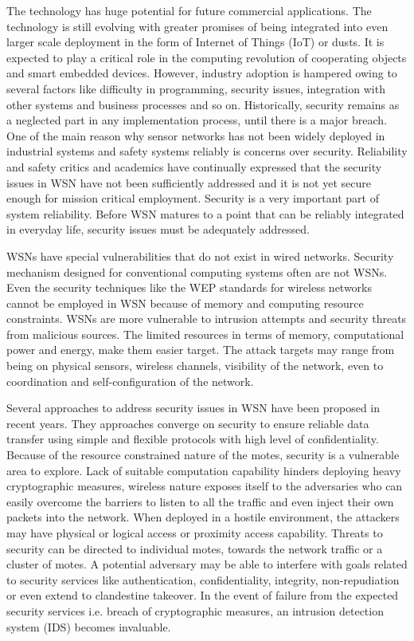\documentclass[conference,final]{IEEEtran}
\newcommand{\dme}[2]{\pdfmarkupcomment[markup=Highlight,color=yellow]{#1}{#2}}
\begin{document}
The technology has huge potential for future commercial applications. 
The technology is still evolving with greater promises of being integrated into even larger scale deployment in the form of Internet of Things (IoT) or dusts.
It is expected to play a critical role in the  computing revolution of cooperating objects and smart embedded devices. 
However, industry adoption is hampered owing to several factors like difficulty in programming, security issues, integration with other systems and business processes and so on. 
Historically, security remains as a neglected part in any implementation process, until there is a major breach. 
One of the main reason why sensor networks has not been widely deployed in industrial systems and safety systems reliably is concerns over security.
Reliability and safety critics and academics have continually expressed that  the security issues in WSN have not been sufficiently addressed and it is not yet secure enough for mission critical employment.
Security is a very important part of system reliability.
Before WSN matures to a point that can be reliably integrated in everyday life, security issues must be adequately addressed. 



WSNs have special vulnerabilities that do not exist in wired networks.
Security mechanism designed for conventional computing systems often are not \dme{appropriate for}{or ``applicable to''} WSNs.
Even the security techniques like the WEP standards for wireless networks cannot be employed in WSN because of memory and computing resource constraints.
WSNs are more vulnerable to intrusion attempts and security threats from malicious sources.
The limited resources in terms of memory, computational power and energy, make them easier target. 
The attack targets may range from being on physical sensors, wireless channels, visibility of the network, even  to coordination and self-configuration of the network.

Several approaches to address security issues in WSN have been proposed in recent years. 
They approaches converge on security to ensure reliable data transfer using simple and flexible protocols with high level of confidentiality. 
Because of the resource constrained nature of the motes, security is a vulnerable area to explore.
Lack of suitable computation capability hinders deploying heavy cryptographic measures, wireless nature exposes itself to the adversaries who can easily overcome the barriers to listen to all the traffic and even inject their own packets into the network.
When deployed in a hostile environment, the attackers may have physical or logical access or proximity access capability. 
Threats to security  can be directed to individual motes, towards the network traffic or  a cluster of motes.
A potential adversary may be able to interfere with goals related to security services like authentication, confidentiality, integrity, non-repudiation or even extend to clandestine takeover.
In the event of failure from the expected security services i.e. breach of cryptographic measures, an intrusion detection system (IDS) becomes invaluable.
\end{document}
